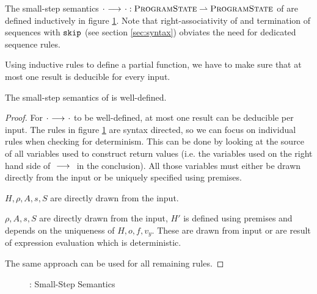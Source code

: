 The small-step semantics ${\cdot} \,\,{\longrightarrow^{}}\,\, {\cdot} : \textup{\textsc{ProgramState}} \rightharpoonup \textup{\textsc{ProgramState}}$ of \svlidf are defined inductively in figure \ref{fig:svl-sem-dyn-sstep}.
Note that right-associativity of \ttt{;} and termination of sequences with $\textup{\texttt{skip}}$ (see section \ref{sec:syntax}) obviates the need for dedicated sequence rules.

Using inductive rules to define a partial function, we have to make sure that at most one result is deducible for every input.
\begin{lemma}
    \label{lemma:ss-wd}
    The small-step semantics of \svlidf is well-defined.
\end{lemma}
\begin{proof}
    For ${\cdot} \,\,{\longrightarrow^{}}\,\, {\cdot}$ to be well-defined, at most one result can be deducible per input.
    The rules in figure \ref{fig:svl-sem-dyn-sstep} are syntax directed, so we can focus on individual rules when checking for determinism.
    This can be done by looking at the source of all variables used to construct return values (i.e. the variables used on the right hand side of ${} \,\,{\longrightarrow^{}}\,\, {}$ in the conclusion).
    All those variables must either be drawn directly from the input or be uniquely specified using premises.
    
    $H, \rho, A, s, S$ are directly drawn from the input.
    
    $\rho, A, s, S$ are directly drawn from the input, $H'$ is defined using premises and depends on the uniqueness of $H, o, f, v_y$.
    These are drawn from input or are result of expression evaluation which is deterministic.
    
    The same approach can be used for all remaining rules.
\end{proof}

\begin{figure}
    \boxed{\sstep{\pi}{\pi}}
    
    \caption{\svlidf: Small-Step Semantics}
    \label{fig:svl-sem-dyn-sstep}
\end{figure}


